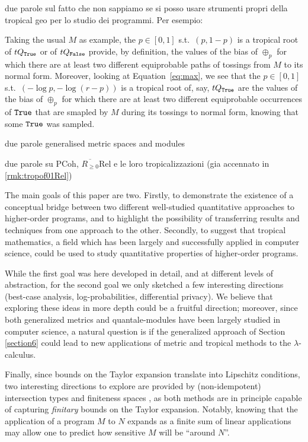 
{\color{red}due parole sul fatto che non sappiamo se si posso usare strumenti propri della tropical geo per lo studio dei programmi. Per esempio:}
\begin{remark}\label{rem:troproots}
 Taking the usual $M$ as example, the $p\in[0,1]$ s.t.\ $(p,1-p)$ is a tropical root of $\trop Q_{\true}$ or of $\trop Q_{\false}$ provide, by definition, the values of the bias of $\oplus_p$ for which there are at least two different equiprobable paths of tossings from $M$ to its normal form.
 Moreover, looking at Equation~\ref{eq:max}, we see that the $p\in[0,1]$ s.t.\ $(-\log p,-\log(r-p))$ is a tropical root of, say, $\trop Q_{\true}$ are the values of the bias of $\oplus_p$ for which there are at least two different equiprobable occurrences of $\mathtt{True}$ that are smapled by $M$ during its tossings to normal form, knowing that some $\mathtt{True}$ was sampled.
\end{remark}

{\color{red}due parole generalised metric spaces and modules}


{\color{red}due parole su PCoh, $\overline{R_{\geq 0}}$Rel e le loro tropicalizzazioni (gia accennato in \autoref{rmk:tropof01Rel})}

The main goals of this paper are two. Firstly,  to
demonstrate the existence of a conceptual bridge between two different well-studied quantitative approaches to higher-order programs, and to highlight the possibility of transferring results and techniques from one approach to the other. 
Secondly, to suggest that tropical mathematics, a
field which has been largely and successfully applied in computer science, could be used to study quantitative properties of higher-order programs.

While the first goal was here developed in detail, and at different levels of abstraction, for the second goal we only sketched a few interesting directions (best-case analysis, log-probabilities, differential privacy). We believe that exploring these ideas in more depth could be a fruitful direction; moreover, 
since both generalized metrics and quantale-modules have been largely studied in computer science, 
a natural question is if the generalized approach of Section \ref{section6} could  lead to new applications of metric and tropical methods to the $\lambda$-calculus.

Finally, since bounds on the Taylor expansion translate into Lipschitz conditions, 
 two interesting directions to explore are provided by (non-idempotent) intersection types and finiteness spaces \cite{Ehrhard2005}, as both methods are in principle capable of capturing \emph{finitary} bounds on the Taylor expansion. %
Notably, knowing that the application of a program $M$ to $N$ expands as a finite sum of linear applications may allow one to predict how sensitive $M$ will be ``around $N$''. 

\newpage